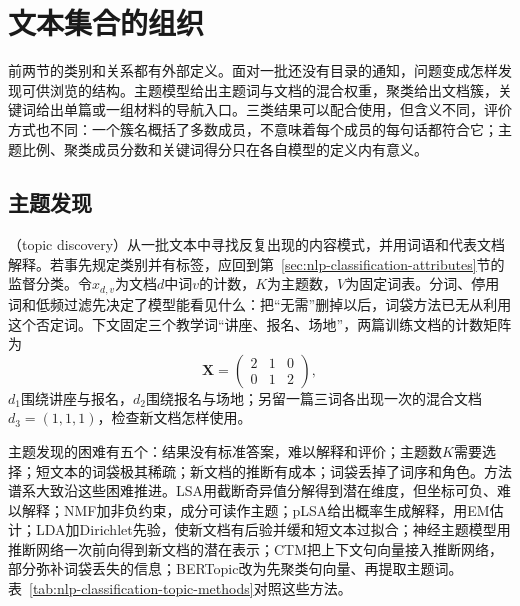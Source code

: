 \section{文本集合的组织}
\label{sec:nlp-classification-organization}

前两节的类别和关系都有外部定义。面对一批还没有目录的通知，问题变成怎样发现可供浏览的结构。主题模型给出主题词与文档的混合权重，聚类给出文档簇，关键词给出单篇或一组材料的导航入口。三类结果可以配合使用，但含义不同，评价方式也不同：一个簇名概括了多数成员，不意味着每个成员的每句话都符合它；主题比例、聚类成员分数和关键词得分只在各自模型的定义内有意义。

\subsection{主题发现}
\label{sec:nlp-classification-topics}

（topic discovery）从一批文本中寻找反复出现的内容模式，并用词语和代表文档解释。若事先规定类别并有标签，应回到第~\ref{sec:nlp-classification-attributes}节的监督分类。令$x_{d,v}$为文档$d$中词$v$的计数，$K$为主题数，$V$为固定词表。分词、停用词和低频过滤先决定了模型能看见什么：把“无需”删掉以后，词袋方法已无从利用这个否定词。下文固定三个教学词“讲座、报名、场地”，两篇训练文档的计数矩阵为
\begin{equation}
 \label{eq:nlp-classification-topic-counts}
 \bm X=\begin{pmatrix}2&1&0\\0&1&2\end{pmatrix},
\end{equation}
$d_1$围绕讲座与报名，$d_2$围绕报名与场地；另留一篇三词各出现一次的混合文档$d_3=(1,1,1)$，检查新文档怎样使用。

主题发现的困难有五个：结果没有标准答案，难以解释和评价；主题数$K$需要选择；短文本的词袋极其稀疏；新文档的推断有成本；词袋丢掉了词序和角色。方法谱系大致沿这些困难推进。LSA用截断奇异值分解得到潜在维度，但坐标可负、难以解释；NMF加非负约束，成分可读作主题；pLSA给出概率生成解释，用EM估计；LDA加Dirichlet先验，使新文档有后验并缓和短文本过拟合；神经主题模型用推断网络一次前向得到新文档的潜在表示；CTM把上下文句向量接入推断网络，部分弥补词袋丢失的信息；BERTopic改为先聚类句向量、再提取主题词。表~\ref{tab:nlp-classification-topic-methods}对照这些方法。

